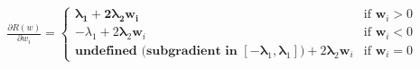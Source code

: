\documentclass[preview]{standalone}
\begin{document}
\begin{align*}
\frac{\partial R(w)}{\partial w_i} =\begin{cases}\boldsymbol{\lambda}_\textbf{1} + \mathbf{2\lambda_2} \mathbf{w_i} & \text{if } \mathbf{w}_i > 0 \\-\lambda_1 + 2\mathbf{\lambda}_2 \mathbf{w}_i & \text{if } \mathbf{w}_i < 0 \\\textbf{undefined (subgradient in } [-\boldsymbol{\lambda}_1, \boldsymbol{\lambda}_1]\textbf{)} + 2\mathbf{\lambda}_2 \mathbf{w}_i & \text{if } \mathbf{w}_i = 0\end{cases}
\end{align*}
\end{document}
